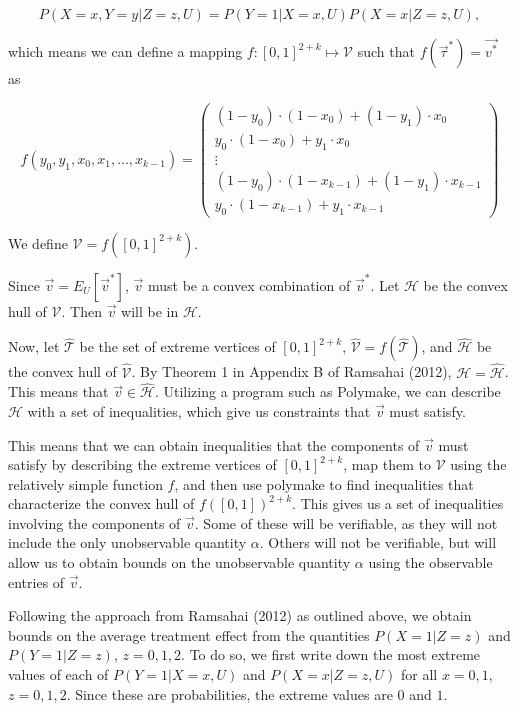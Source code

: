 \documentclass[
]{article}
\theoremstyle{plain}
\begin{document}
\[
P(X = x, Y = y | Z = z, U) = P(Y = 1 | X = x, U) P(X = x | Z = z, U),
\]

which means we can define a mapping \(f:[0,1]^{2+k} \mapsto \mathcal{V}\) such that \(f(\vec{\tau}^*) = \vec{v^*}\) as

\[
f(y_0, y_1, x_0, x_1, ..., x_{k-1}) =
  \begin{pmatrix}
    (1-y_0)\cdot(1-x_0) + (1 - y_1)\cdot x_0 \\
    y_0\cdot (1-x_0) + y_1\cdot x_0 \\
    \vdots \\
    (1-y_0)\cdot(1-x_{k-1}) + (1 - y_1)\cdot x_{k-1} \\
    y_0\cdot (1-x_{k-1}) + y_1\cdot x_{k-1}
  \end{pmatrix} \label{eq:f}
\]

We define \(\mathcal{V} = f([0,1]^{2+k})\).

Since \(\vec{v} = E_U[\vec{v}^*]\), \(\vec{v}\) must be a convex combination of \(\vec{v}^*\). Let \(\mathcal{H}\) be the convex hull of \(\mathcal{V}\). Then \(\vec{v}\) will be in \(\mathcal{H}\).

Now, let \(\hat{\mathcal{T}}\) be the set of extreme vertices of \([0,1]^{2+k}\), \(\hat{\mathcal{V}} = f(\hat{\mathcal{T}})\), and \(\hat{\mathcal{H}}\) be the convex hull of \(\hat{\mathcal{V}}\). By Theorem 1 in Appendix B of Ramsahai (2012), \(\mathcal{H} = \mathcal{\hat{H}}\). This means that \(\vec{v} \in \mathcal{\hat{H}}\). Utilizing a program such as Polymake, we can describe \(\mathcal{H}\) with a set of inequalities, which give us constraints that \(\vec{v}\) must satisfy.

This means that we can obtain inequalities that the components of \(\vec{v}\) must satisfy by describing the extreme vertices of \([0,1]^{2+k}\), map them to \(\mathcal{V}\) using the relatively simple function \(f\), and then use polymake to find inequalities that characterize the convex hull of \(f([0,1])^{2+k}\). This gives us a set of inequalities involving the components of \(\vec{v}\). Some of these will be verifiable, as they will not include the only unobservable quantity \(\alpha\). Others will not be verifiable, but will allow us to obtain bounds on the unobservable quantity \(\alpha\) using the observable entries of \(\vec{v}\).

Following the approach from Ramsahai (2012) as outlined above, we obtain bounds on the average treatment effect from the quantities \(P(X = 1 | Z = z)\) and \(P(Y = 1 | Z = z)\), \(z = 0,1,2\). To do so, we first write down the most extreme values of each of \(P(Y = 1 | X = x, U)\) and \(P(X = x | Z = z, U)\) for all \(x=0,1\), \(z=0,1,2\). Since these are probabilities, the extreme values are \(0\) and \(1\).
\end{document}
